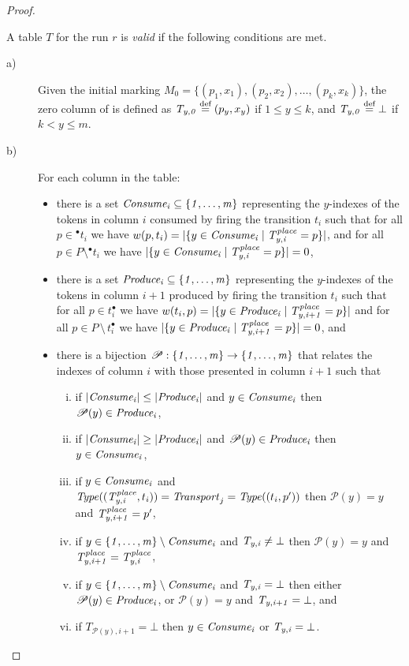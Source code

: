 \begin{proof}
\begin{definition} 
A table $T$ for the run $r$ is \emph{valid} if the following conditions
are met.
\begin{description}
\item[a)] Given the initial marking 
$M_0=\{(p_1,x_1),(p_2,x_2),\ldots,(p_k,x_k)\}$, 
the zero column of  is defined as
${\mathit{T_{y,0}}}\stackrel{\textrm{def}}{=}(p_y,x_y)$ if $1\leq y \leq k$, and 
${\mathit{T_{y,0}}}\stackrel{\textrm{def}}{=}\bot$ if $k <  y \leq m$.
\item[b)] For each column  in the table:
\begin{itemize}
\item there is a set ${\mathit{Consume_i}}\subseteq {\mathit{\{1,\ldots,m\}}}$ representing 
the $y$-indexes of the tokens  in column $i$
consumed by firing the transition $t_i$ such that for all 
$p \in {^\bullet}t_i$ we have 
$w(p,t_i)=|\{y \in {\mathit{Consume_i}} \mid {\mathit{T^{\mathit{place}}_{y,i}}}=p\}|$,
and for all $p \in P \setminus \!^\bullet{t_i}$ we have 
$|\{y \in {\mathit{Consume_i}} \mid {\mathit{T^{\mathit{place}}_{y,i}}}=p\}|=0$, 
\item there is a set ${\mathit{Produce_i}}\subseteq {\mathit{\{1,\ldots,m\}}}$ representing
the $y$-indexes of the tokens in column $i+1$ produced by firing 
the transition $t_i$ such that for all 
$p \in t_i^\bullet$ we have 
$w(t_i,p)=|\{y \in {\mathit{Produce_i}} \mid {\mathit{T^{\mathit{place}}_{y,i+1}}}=p\}|$ 
and for all $p \in P\,\setminus\, t_i^\bullet$ we have 
$|\{y \in {\mathit{Produce_i}} \mid {\mathit{T^{\mathit{place}}_{y,i+1}}}=p\}|=0$, and
\item there is a bijection 
${\mathit{\mathscr{P}}}:{\mathit{\{1,\ldots,m\}}}\rightarrow{\mathit{\{1,\ldots,m\}}}$ that relates the indexes 
of column $i$ with 
those presented in column $i+1$ such that
\begin{enumerate}[i)]
\item if $|{\mathit{Consume_i}}| \leq |{\mathit{Produce_i}}|$ and $y \in {\mathit{Consume_i}}$ then $\mathscr{P}(y) \in {\mathit{Produce_i}}$,
\item if $|{\mathit{Consume_i}}| \geq |{\mathit{Produce_i}}|$ and $\mathscr{P}(y) \in {\mathit{Produce_i}}$ then $y \in {\mathit{Consume_i}}$,
\item if $y \in {\mathit{Consume_i}}$ and 
$\mathit{Type}(({\mathit{T^{\mathit{place}}_{y,i}}},t_i))=\mathit{Transport}_j= \mathit{Type}((t_i,p'))$ 
then $\mathscr{P}(y)=y$ and ${\mathit{T^{\mathit{place}}_{y,i+1}}}=p'$,
\item if $y \in {\mathit{\{1,\ldots,m\}}} \setminus {\mathit{Consume_i}}$ and ${\mathit{T_{y,i}}}\neq\bot$ then $\mathscr{P}(y)=y$ and ${\mathit{T^{\mathit{place}}_{y,i+1}}}={\mathit{T^{\mathit{place}}_{y,i}}}$,
\item if  $y \in {\mathit{\{1,\ldots,m\}}}\setminus {\mathit{Consume_i}}$ and ${\mathit{T_{y,i}}}=\bot$ then either $\mathscr{P}(y) \in {\mathit{Produce_i}}$, or $\mathscr{P}(y)=y$ and ${\mathit{T_{y,i+1}}}=\bot$, and

\item if $T_{\mathscr{P}(y),i+1}=\bot$ then $y \in {\mathit{Consume_i}}$ or ${\mathit{T_{y,i}}}=\bot$.
\end{enumerate}
\end{itemize}


\end{description}
\end{definition}
\end{proof}

